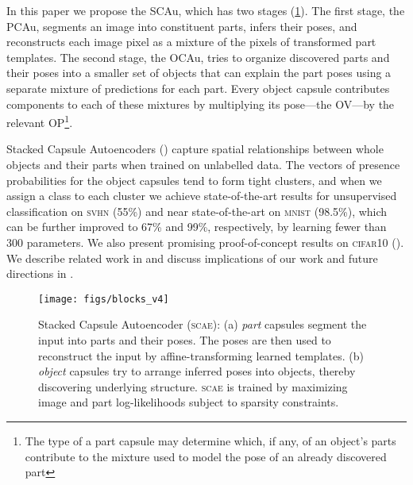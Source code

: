 In this paper we propose the \gls{SCAu}, which has two stages (\cref{fig:capsule_arch}). The first stage, the \gls{PCAu}, segments an image into constituent parts, infers their poses, and reconstructs each image pixel as a mixture of the pixels of transformed part templates.
The second stage, the \gls{OCAu}, tries to organize discovered parts and their poses into a smaller set of objects that can explain the part poses using a separate mixture of predictions for each part. 
Every object capsule contributes components to each of these mixtures by multiplying its pose---the \gls{OV}---by the relevant \gls{OP}\footnote{The type of a part capsule may determine which, if any, of an object's parts contribute to the mixture used to model the pose of an already discovered part}.

Stacked Capsule Autoencoders () capture spatial relationships between whole objects and their parts when trained on unlabelled data.
The vectors of presence probabilities for the object capsules tend to form tight clusters, and when we assign a class to each cluster we achieve state-of-the-art results for unsupervised classification on \textsc{svhn} (55\%) and near state-of-the-art on \textsc{mnist} (98.5\%), which can be further improved to 67\% and 99\%, respectively, by learning fewer than 300 parameters. We also present promising proof-of-concept results on \textsc{cifar10} ().
%
We describe related work in  and discuss implications of our work and future  directions in .

\begin{figure}
    \centering
    \begin{minipage}[c]{0.68\linewidth}
        \centering
        \texttt{[image: figs/blocks\_v4]}
    \end{minipage}
    \hfill
    \begin{minipage}[c]{0.3\linewidth}
        \centering
        \caption{
            Stacked Capsule Autoencoder (\textsc{scae}):
            (a) \textit{part} capsules segment the input into parts and their poses. The poses are then used to reconstruct the input by affine-transforming learned templates.
            (b) \textit{object} capsules try to arrange inferred poses into objects, thereby discovering underlying structure.
            \textsc{scae} is trained by maximizing image and part log-likelihoods subject to sparsity constraints.
        }
        \label{fig:capsule_arch}
    \end{minipage}
    \vspace*{-.75em}
\end{figure}

